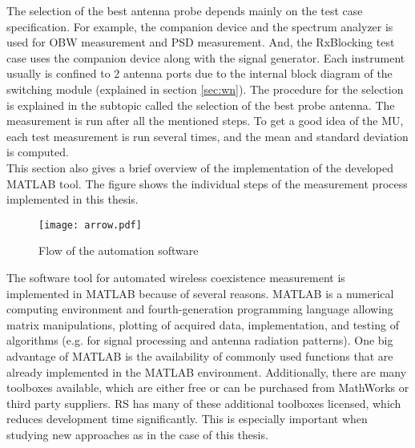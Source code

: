 The selection of the best antenna probe depends mainly on the test case specification. For example, the companion device and the spectrum analyzer is used for \acf{OBW} measurement and \acf{PSD} measurement. And, the \acf{RxBlocking} test case uses the companion device along with the signal generator. Each instrument usually is confined to 2 antenna ports due to the internal block diagram of the switching module (explained in section \ref{sec:wn}). The procedure for the selection is explained in the subtopic called the selection of the best probe antenna. The measurement is run after all the mentioned steps. To get a good idea of the \acf{MU}, each test measurement is run several times, and the mean and standard deviation is computed. \\

This section also gives a brief overview of the implementation of the developed MATLAB\textregistered{} tool. The figure shows the individual steps of the measurement process implemented in this thesis.

\begin{figure}[H]
\centering
\texttt{[image: arrow.pdf]}
\caption{Flow of the automation software}
\label{fig:2} 
\end{figure}

The software tool for automated wireless coexistence measurement is implemented in MATLAB\textregistered{} because of several reasons. MATLAB\textregistered{} is a numerical computing environment and fourth-generation programming language allowing matrix manipulations, plotting of acquired data, implementation, and testing of algorithms (e.g. for signal processing and antenna radiation patterns). One big advantage of MATLAB\textregistered{} is the availability of commonly used functions that are already implemented in the MATLAB\textregistered{} environment. Additionally, there are many toolboxes available, which are either free or can be purchased from MathWorks or third party suppliers. \acs{RS}\textregistered{} has many of these additional toolboxes licensed, which reduces development time significantly. This is especially important when studying new approaches as in the case of this thesis.

